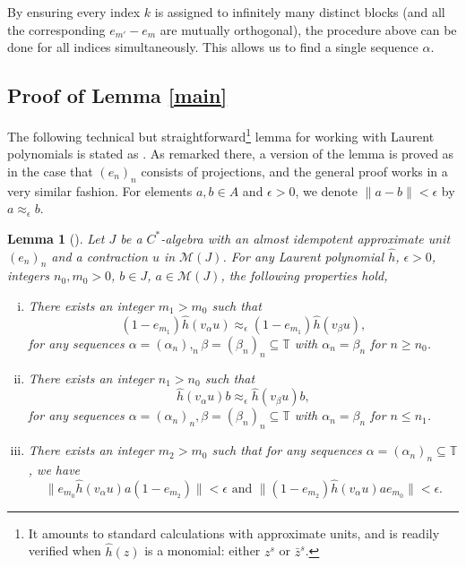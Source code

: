 \documentclass[reqno]{amsart}
\newtheorem{lem}[thm]{Lemma}
\theoremstyle{definition}
\theoremstyle{remark}
\numberwithin{equation}{section}
\theoremstyle{definition}
\newcommand{\calM}{\mathcal{M}}
\begin{document}
By ensuring every index $k$ is assigned to infinitely many distinct blocks (and all the corresponding $e_{m'}-e_m$ are mutually orthogonal), the procedure above can be done for all indices simultaneously. This allows us to find a single sequence $\alpha$.

\subsection{Proof of Lemma \ref{main}}  \label{main_proof_section} 

The following technical but straightforward\footnote{It amounts to standard calculations with approximate units, and is readily verified when $\hat{h}(z)$ is a monomial: either $z^s$ or $\bar{z}^s$.} lemma for working with Laurent polynomials is stated as \cite[Lemma 3.15]{K1-injective}. As remarked there, a version of the lemma is proved as \cite[Lemma 4.2, Lemma 4.3]{ess-codim} in the case that $(e_n)_n$ consists of projections, and the general proof works in a very similar fashion. For elements $a, b\in A$ and $\epsilon > 0$, we denote $\|a-b\| < \epsilon$ by $a\approx_{\epsilon} b$. 

\begin{lem}[{\cite[Lemma 3.15]{K1-injective}}]
\label{finite_block_Laurent} 
Let $J$ be a $C^*$-algebra with an almost idempotent approximate unit $(e_{n})_{n}$ and a contraction $u$ in $\calM(J)$. For any Laurent polynomial $\hat{h}$, $\epsilon > 0$, integers $n_{0}, m_{0}>0$, $b\in J$, $a\in \calM(J)$, the following properties hold, 
\begin{enumerate} [(i)] 
\item There exists an integer $m_{1}> m_{0}$ such that 
\begin{equation} 
(1-e_{m_{1}})  \hat{h}(v_{\alpha}u) \approx_{\epsilon} (1-e_{m_{1}})\hat{h}(v_{\beta}u), 
\end{equation}  
for any sequences $\alpha = (\alpha_{n}),_{n} \beta = (\beta_{n})_{n}\subseteq \mathbb{T}$ with $\alpha_{n} = \beta_{n}$ for $n\geq n_{0}$. 
\item There exists an integer $n_{1} > n_{0}$ such that 
\begin{equation} 
\hat{h}(v_{\alpha}u)b \approx_{\epsilon} \hat{h}(v_{\beta}u)b, 
\end{equation}  
for any sequences $\alpha = (\alpha_{n})_{n}, \beta = (\beta_{n})_{n}\subseteq \mathbb{T}$ with $\alpha_{n} = \beta_{n}$ for $n\leq n_{1}$. 
\item There exists an integer $m_{2} > m_{0}$ such that for any sequences $\alpha = (\alpha_{n})_{n}\subseteq \mathbb{T}$, we have 
\begin{equation} 
\|e_{m_{0}}\hat{h}(v_{\alpha}u) a (1-e_{m_{2}}) \| < \epsilon \text{ and } \|(1-e_{m_{2}})\hat{h}(v_{\alpha}u) a e_{m_{0}}\| < \epsilon. 
\end{equation}  
\end{enumerate} 
\end{lem} 
\end{document}
